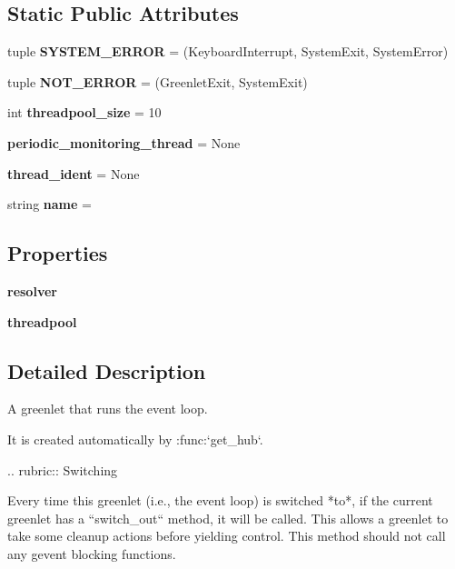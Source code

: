 \subsection*{Static Public Attributes}
\begin{DoxyCompactItemize}
\item 
\mbox{\label{classgevent_1_1hub_1_1_hub_aae4a7aee38813de3bac8716cdfc09d7e}} 
tuple {\bfseries S\+Y\+S\+T\+E\+M\+\_\+\+E\+R\+R\+OR} = (Keyboard\+Interrupt, System\+Exit, System\+Error)
\item 
\mbox{\label{classgevent_1_1hub_1_1_hub_a2b262085f66804cc72ad93ecdd189235}} 
tuple {\bfseries N\+O\+T\+\_\+\+E\+R\+R\+OR} = (Greenlet\+Exit, System\+Exit)
\item 
\mbox{\label{classgevent_1_1hub_1_1_hub_a4f31526ef6342949c9977eaad79f11ec}} 
int {\bfseries threadpool\+\_\+size} = 10
\item 
\mbox{\label{classgevent_1_1hub_1_1_hub_ad36cc50934d42688adddbeb0327f78a3}} 
{\bfseries periodic\+\_\+monitoring\+\_\+thread} = None
\item 
\mbox{\label{classgevent_1_1hub_1_1_hub_a9d41b34ab7c10515dadcdb7deb9846c3}} 
{\bfseries thread\+\_\+ident} = None
\item 
\mbox{\label{classgevent_1_1hub_1_1_hub_aa6c9dfa283e790aafcfd09b54c3f5e26}} 
string {\bfseries name} = \textquotesingle{}\textquotesingle{}
\end{DoxyCompactItemize}
\subsection*{Properties}
\begin{DoxyCompactItemize}
\item 
{\bfseries resolver}
\item 
{\bfseries threadpool}
\end{DoxyCompactItemize}


\subsection{Detailed Description}
\begin{DoxyVerb}A greenlet that runs the event loop.

It is created automatically by :func:`get_hub`.

.. rubric:: Switching

Every time this greenlet (i.e., the event loop) is switched *to*,
if the current greenlet has a ``switch_out`` method, it will be
called. This allows a greenlet to take some cleanup actions before
yielding control. This method should not call any gevent blocking
functions.
\end{DoxyVerb}
 

